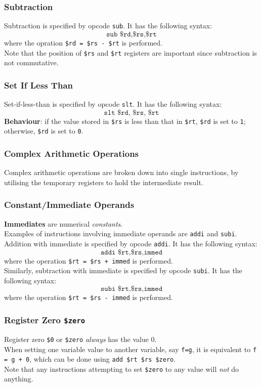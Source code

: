 \documentclass[12pt]{article}
\theoremstyle{definition}
\begin{document}
\subsubsection{Subtraction}
Subtraction is specified by opcode \texttt{sub}. It has the following syntax:
\[
\texttt{sub \$rd,\$rs,\$rt}
\]
where the opration \texttt{\$rd = \$rs - \$rt} is performed.\\
Note that the position of \texttt{\$rs} and \texttt{\$rt} registers are important since subtraction is not commutative.
\subsubsection{Set If Less Than}
Set-if-less-than is specified by opcode \texttt{slt}. It has the following syntax:
\[
\texttt{slt \$rd, \$rs, \$rt}
\]
\textbf{Behaviour}: if the value stored in \texttt{\$rs} is less than that in \texttt{\$rt}, \texttt{\$rd} is set to \texttt{1}; otherwise, \texttt{\$rd} is set to \texttt{0}.
\subsubsection{Complex Arithmetic Operations}
Complex arithmetic operations are broken down into single instructions, by utilising the temporary registers to hold the intermediate result.
\subsubsection{Constant/Immediate Operands}
\textbf{Immediates} are numerical \textit{constants}.\\Examples of instructions involving immediate operands are \texttt{addi} and \texttt{subi}.
Addition with immediate is specified by opcode \texttt{addi}. It has the following syntax:
\[
\texttt{addi \$rt,\$rs,immed}
\]
where the operation \texttt{\$rt = \$rs + immed} is performed.\\
Similarly, subtraction with immediate is specified by opcode \texttt{subi}. It has the following syntax:
\[
\texttt{subi \$rt,\$rs,immed}
\]
where the operation \texttt{\$rt = \$rs - immed} is performed.
\subsubsection{Register Zero {\texttt{\$zero}}}
Register zero \texttt{\$0} or \texttt{\$zero} \textit{always} has the value 0.\\When setting one variable value to another variable, say \texttt{f=g}, it is equivalent to \texttt{f = g + 0}, which can be done using \texttt{add \$rt \$rs \$zero}.\\
Note that any instructions attempting to set \texttt{\$zero} to any value will \textit{not} do anything.
\end{document}
